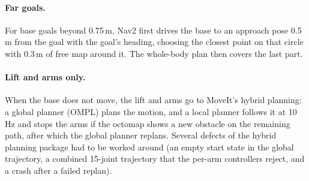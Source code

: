 \documentclass[12pt,a4paper]{article}
\begin{document}
\paragraph{Far goals.}
For base goals beyond 0.75\,m, Nav2 first drives the base to an approach pose 0.5\,m from the goal
with the goal's heading, choosing the closest point on that circle with 0.3\,m of free map around it.
The whole-body plan then covers the last part.

\paragraph{Lift and arms only.}
When the base does not move, the lift and arms go to MoveIt's hybrid planning: a global planner
(OMPL) plans the motion, and a local planner follows it at 10\,Hz and stops the arms if the octomap
shows a new obstacle on the remaining path, after which the global planner replans. Several defects
of the hybrid planning package had to be worked around (an empty start state in the global trajectory,
a combined 15-joint trajectory that the per-arm controllers reject, and a crash after a failed replan).
\end{document}
